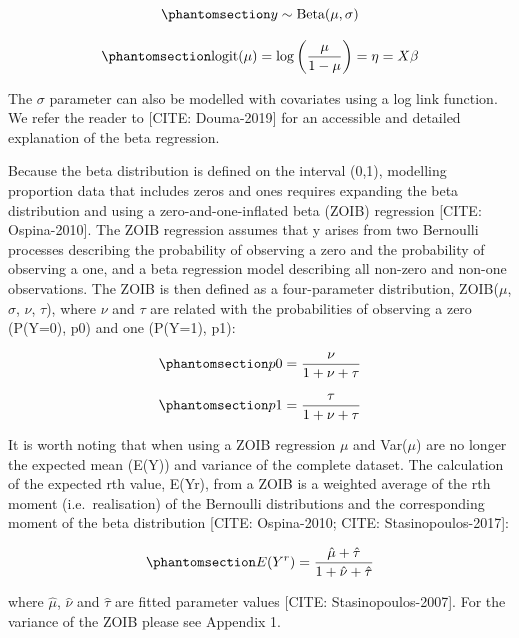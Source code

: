 \documentclass[
  numafflabel,
  authoryear,
  preprint]{elsarticle}
\begin{document}
\begin{equation}\phantomsection\label{eq-2}{
y \sim \text{Beta}(\mu, \sigma)
}\end{equation}

\begin{equation}\phantomsection\label{eq-3}{
\text{logit}(\mu) = \log\left(\frac{\mu}{1 - \mu}\right) = \eta = X\beta
}\end{equation}

The \(\sigma\) parameter can also be modelled with covariates using a
log link function. We refer the reader to {[}CITE: Douma-2019{]} for an
accessible and detailed explanation of the beta regression.

Because the beta distribution is defined on the interval (0,1),
modelling proportion data that includes zeros and ones requires
expanding the beta distribution and using a zero-and-one-inflated beta
(ZOIB) regression {[}CITE: Ospina-2010{]}. The ZOIB regression assumes
that y arises from two Bernoulli processes describing the probability of
observing a zero and the probability of observing a one, and a beta
regression model describing all non-zero and non-one observations. The
ZOIB is then defined as a four-parameter distribution, ZOIB(\(\mu\),
\(\sigma\), \(\nu\), \(\tau\)), where \(\nu\) and \(\tau\) are related
with the probabilities of observing a zero (P(Y=0), p0) and one (P(Y=1),
p1):

\begin{equation}\phantomsection\label{eq-4}{
p0 = \frac{\nu}{1 + \nu + \tau}
}\end{equation}

\begin{equation}\phantomsection\label{eq-5}{
p1 = \frac{\tau}{1 + \nu + \tau}
}\end{equation}

It is worth noting that when using a ZOIB regression \(\mu\) and
Var(\(\mu\)) are no longer the expected mean (E(Y)) and variance of the
complete dataset. The calculation of the expected rth value, E(Yr), from
a ZOIB is a weighted average of the rth moment (i.e.~realisation) of the
Bernoulli distributions and the corresponding moment of the beta
distribution {[}CITE: Ospina-2010; CITE: Stasinopoulos-2017{]}:

\begin{equation}\phantomsection\label{eq-6}{
E(Y^r) = \frac{\hat{\mu} + \hat{\tau}}{1 + \hat{\nu} + \hat{\tau}}
}\end{equation}

where \(\hat{\mu}\), \(\hat{\nu}\) and \(\hat{\tau}\) are fitted
parameter values {[}CITE: Stasinopoulos-2007{]}. For the variance of the
ZOIB please see Appendix 1.
\end{document}
